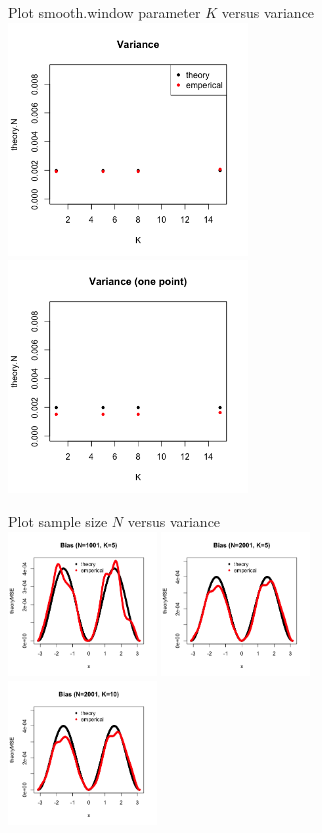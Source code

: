 \documentclass{article}
\begin{document}
\begin{itemize}
\begin{figure}[H]
Plot smooth.window parameter $K$ versus variance\\
\includegraphics[width=2.5in]{pic/K.png}
\includegraphics[width=2.5in]{pic/K2.png}
\end{figure}

\begin{figure}[H]
Plot sample size $N$ versus variance\\
\includegraphics[width=1.55in]{pic/bias1.png}
\includegraphics[width=1.55in]{pic/bias2.png}
\includegraphics[width=1.55in]{pic/bias3.png}
\end{figure}


\end{itemize}
\end{document}
